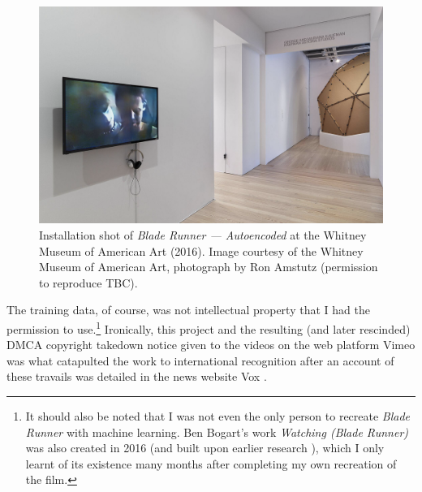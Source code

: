 \begin{figure}[!htb]
    \centering
    \captionsetup{justification=centering}
    \includegraphics[width=1\textwidth]{figures/c1_intro/whitney-installation-shot.png}
    \caption[Installation shot of of \textit{Blade Runner --- Autoencoded}]{Installation shot of \textit{Blade Runner --- Autoencoded} at the Whitney Museum of American Art (2016). Image courtesy of the Whitney Museum of American Art, photograph by Ron Amstutz (permission to reproduce TBC).}
    \label{fig:c1:blade-runner-whitney}
\end{figure}

The training data, of course, was not intellectual property that I had the permission to use.\footnote{It should also be noted that I was not even the only person to recreate \textit{Blade Runner} with machine learning. Ben Bogart's work \textit{Watching (Blade Runner)} was also created in 2016 \citep{bogart2016watching} (and built upon earlier research \citep{bogart2008memory,bogart2013context}), which I only learnt of its existence many months after completing my own recreation of the film.}
Ironically, this project and the resulting (and later rescinded) DMCA copyright takedown notice given to the videos on the web platform Vimeo was what catapulted the work to international recognition after an account of these travails was detailed in the news website Vox \citep{romano2016bladerunner}.

